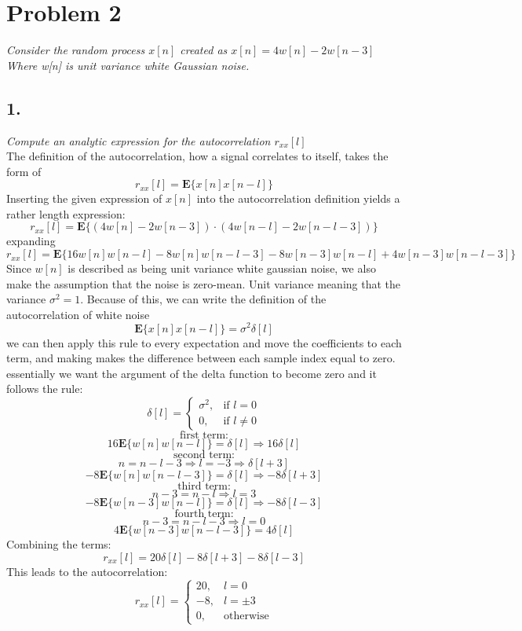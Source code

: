 \section{Problem 2}
\textit{Consider the random process $x[n]$ created as $x[n] = 4w[n] - 2w[n-3]$ Where
w[n] is unit variance white Gaussian noise.}

\subsection{1.}
\textit{Compute an analytic expression for the autocorrelation $r_{xx}[l]$}\\
The definition of the autocorrelation, how a signal correlates to itself, takes the 
form of 
\[r_{xx}[l] = \textbf{E}\{x[n]x[n-l]\} \]
Inserting the given expression of $x[n]$ into the autocorrelation definition yields a rather length expression:
\[
r_{xx}[l] =
\textbf{E}\{(4w[n] - 2w[n-3])\cdot(4w[n-l] - 2w[n-l-3])\}
\]
expanding
\[
r_{xx}[l] = 
\textbf{E}\{
16w[n]w[n-l]
- 8w[n]w[n-l-3]
- 8w[n-3]w[n-l]
+ 4w[n-3]w[n-l-3]
\}
\]
Since $w[n]$ is described as being unit variance white gaussian noise, we 
also make the assumption that the noise is zero-mean.
Unit variance meaning that the variance $\sigma^2 = 1$. Because of this, we
can write the definition of the autocorrelation of white noise
\[
\textbf{E}\{x[n]x[n-l]\} = \sigma^2\delta[l]
\]
we can then apply this rule to every expectation and move the coefficients to each term, and making
makes the difference between each sample index equal to zero. essentially we want the argument of the 
delta function to become zero and it follows the rule:
\[
\delta[l] = \begin{cases}
    \sigma^2, & \text{if } l = 0\\
    0, & \text{if } l \neq 0
\end{cases}
\]
\[\text{first term:} \]
\[16\textbf{E}\{w[n]w[n-l]\} = \delta[l] \Rightarrow 16\delta[l]\]
\[\text{second term:}\]
\[ n = n - l - 3 \Rightarrow l = -3 \Rightarrow \delta[l+3]\]
\[-8\textbf{E}\{w[n]w[n-l-3]\} = \delta[l]\Rightarrow -8\delta[l+3]\]
\[\text{third term:}\]
\[ n - 3 = n - l \Rightarrow l = 3\]
\[-8\textbf{E}\{w[n-3]w[n-l]\} = \delta[l] \Rightarrow -8\delta[l-3]\]
\[\text{fourth term:}\]
\[ n - 3 = n - l - 3 \Rightarrow l = 0 \]
\[4\textbf{E}\{w[n-3]w[n-l-3]\} = 4\delta[l]\]
Combining the terms:
\[r_{xx}[l] = 20\delta[l]-8\delta[l+3]-8\delta[l-3]\]
This leads to the autocorrelation:
\[
r_{xx}[l] = \begin{cases}
    20, & l = 0\\
    -8, & l = \pm3\\
    0, & \text{otherwise} 
\end{cases}
\]


